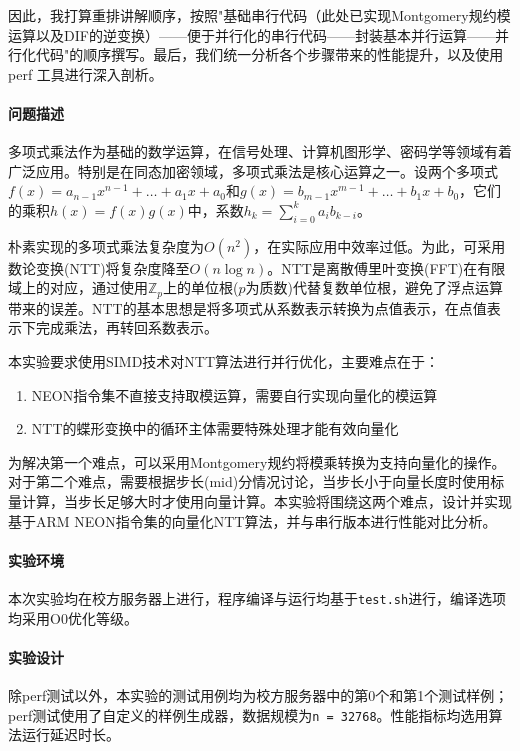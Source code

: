 \documentclass[a4paper]{article}
\begin{document}
因此，我打算重排讲解顺序，按照"基础串行代码（此处已实现Montgomery规约模运算以及DIF的逆变换）——便于并行化的串行代码——封装基本并行运算——并行化代码"的顺序撰写。最后，我们统一分析各个步骤带来的性能提升，以及使用 perf 工具进行深入剖析。

\paragraph{问题描述} 多项式乘法作为基础的数学运算，在信号处理、计算机图形学、密码学等领域有着广泛应用。特别是在同态加密领域，多项式乘法是核心运算之一。设两个多项式$f(x) = a_{n-1}x^{n-1} + \ldots + a_1x + a_0$和$g(x) = b_{m-1}x^{m-1} + \ldots + b_1x + b_0$，它们的乘积$h(x) = f(x)g(x)$中，系数$h_k = \sum_{i=0}^{k} a_i b_{k-i}$。

朴素实现的多项式乘法复杂度为$O(n^2)$，在实际应用中效率过低。为此，可采用数论变换(NTT)将复杂度降至$O(n\log n)$。NTT是离散傅里叶变换(FFT)在有限域上的对应，通过使用$\mathbb{Z}_p$上的单位根($p$为质数)代替复数单位根，避免了浮点运算带来的误差。NTT的基本思想是将多项式从系数表示转换为点值表示，在点值表示下完成乘法，再转回系数表示。

本实验要求使用SIMD技术对NTT算法进行并行优化，主要难点在于：
\begin{enumerate}
    \item NEON指令集不直接支持取模运算，需要自行实现向量化的模运算
    \item NTT的蝶形变换中的循环主体需要特殊处理才能有效向量化
\end{enumerate}

为解决第一个难点，可以采用Montgomery规约将模乘转换为支持向量化的操作。对于第二个难点，需要根据步长(mid)分情况讨论，当步长小于向量长度时使用标量计算，当步长足够大时才使用向量计算。本实验将围绕这两个难点，设计并实现基于ARM NEON指令集的向量化NTT算法，并与串行版本进行性能对比分析。

\paragraph{实验环境} 本次实验均在校方服务器上进行，程序编译与运行均基于\texttt{test.sh}进行，编译选项均采用O0优化等级。

\paragraph{实验设计} 除perf测试以外，本实验的测试用例均为校方服务器中的第0个和第1个测试样例；perf测试使用了自定义的样例生成器，数据规模为\texttt{n = 32768}。性能指标均选用算法运行延迟时长。
\end{document}
